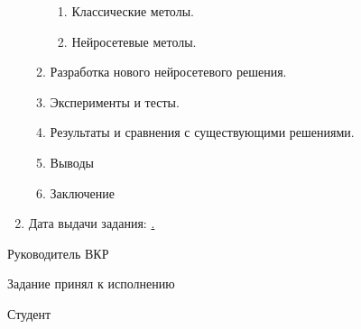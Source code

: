 \begin{enumerate}[1.]
\begin{enumerate}[label=\theenumi\arabic*.]
\begin{enumerate}[label=\theenumii\arabic*.]
			\item Классические метолы.
			\item Нейросетевые метолы.
		\end{enumerate}
		\item Разработка нового нейросетевого решения.
		\item Эксперименты и тесты.
		\item Результаты и сравнения с существующими решениями.
		\item Выводы
		\item Заключение 
	\end{enumerate}
		\item Дата выдачи задания: \uline{\thesisStartDate.}
\end{enumerate}

\intervalS%

Руководитель ВКР \uline{\hspace*{0.3\textheight}} \Supervisor





\intervalS%


Задание принял к исполнению %

\intervalS%

Студент \uline{\hspace*{0.4\textheight}} \Author



